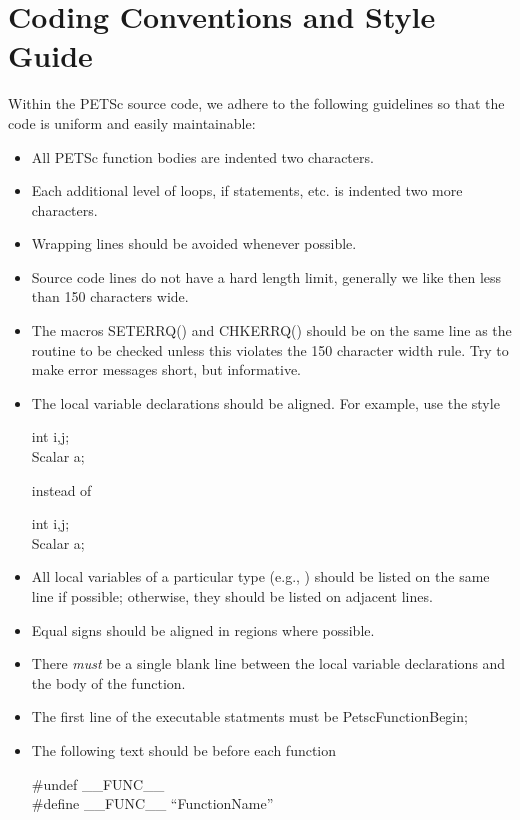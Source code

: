 \documentclass[twoside,12pt]{../sty/report_petsc}
\begin{document}
\section{Coding Conventions and Style Guide}

Within the PETSc source code, we adhere to the following guidelines
so that the code is uniform and easily maintainable:

\begin{itemize}
\item All PETSc function bodies are indented two characters.
\item Each additional level of loops, if statements, etc. is indented
      two more characters.
\item Wrapping lines should be avoided whenever possible.
\item Source code lines do not have a hard length limit, generally we like then less than 150 characters wide.
\item The macros SETERRQ() and CHKERRQ() should be on the 
      same line as the routine to be checked unless this violates the 
      150 character width rule. Try to make error messages short, but 
      informative.
\item The local variable declarations should be aligned. For example,
      use the style
\begin{tabbing}
   int    i,j;\\
   Scalar a;
\end{tabbing}
instead of
\begin{tabbing}
   int i,j;\\
   Scalar a;
\end{tabbing}
\item All local variables of a particular type (e.g., ) should be 
      listed on the same line if possible; otherwise, they should be listed
      on adjacent lines.
\item Equal signs should be aligned in regions where possible.
\item There {\em must} be a single blank line
      between the local variable declarations and the body of the function.
\item The first line of the executable statments must be PetscFunctionBegin;
\item The following text should be before each function
\begin{tabbing}
\#undef \_\_FUNC\_\_\\
\#define \_\_FUNC\_\_ ``FunctionName''
\end{tabbing}

\end{itemize}
\end{document}
